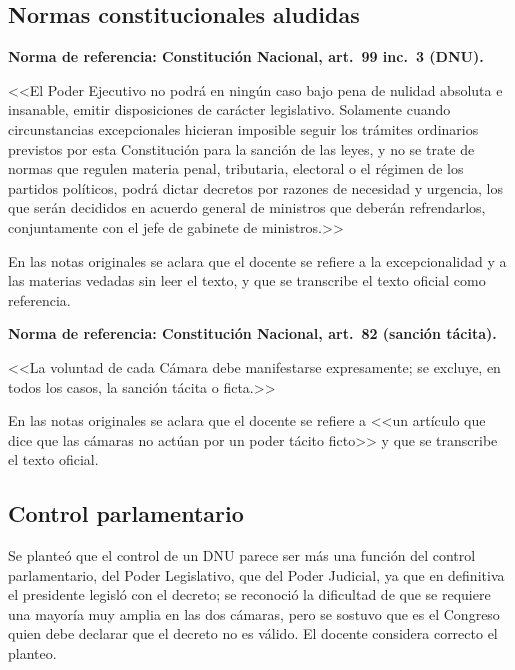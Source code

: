 \documentclass[12pt,oneside]{book}
\begin{document}
\subsection{Normas constitucionales aludidas}

\begin{note}
\textbf{Norma de referencia: Constitución Nacional, art.~99 inc.~3 (DNU).}

<<El Poder Ejecutivo no podrá en ningún caso bajo pena de nulidad absoluta e insanable, emitir disposiciones de carácter legislativo. Solamente cuando circunstancias excepcionales hicieran imposible seguir los trámites ordinarios previstos por esta Constitución para la sanción de las leyes, y no se trate de normas que regulen materia penal, tributaria, electoral o el régimen de los partidos políticos, podrá dictar decretos por razones de necesidad y urgencia, los que serán decididos en acuerdo general de ministros que deberán refrendarlos, conjuntamente con el jefe de gabinete de ministros.>>

En las notas originales se aclara que el docente se refiere a la excepcionalidad y a las materias vedadas sin leer el texto, y que se transcribe el texto oficial como referencia.
\end{note}

\begin{note}
\textbf{Norma de referencia: Constitución Nacional, art.~82 (sanción tácita).}

<<La voluntad de cada Cámara debe manifestarse expresamente; se excluye, en todos los casos, la sanción tácita o ficta.>>

En las notas originales se aclara que el docente se refiere a <<un artículo que dice que las cámaras no actúan por un poder tácito ficto>> y que se transcribe el texto oficial.
\end{note}

\subsection{Control parlamentario}

Se planteó que el control de un DNU parece ser más una función del control parlamentario, del Poder Legislativo, que del Poder Judicial, ya que en definitiva el presidente legisló con el decreto; se reconoció la dificultad de que se requiere una mayoría muy amplia en las dos cámaras, pero se sostuvo que es el Congreso quien debe declarar que el decreto no es válido. El docente considera correcto el planteo.
\end{document}
